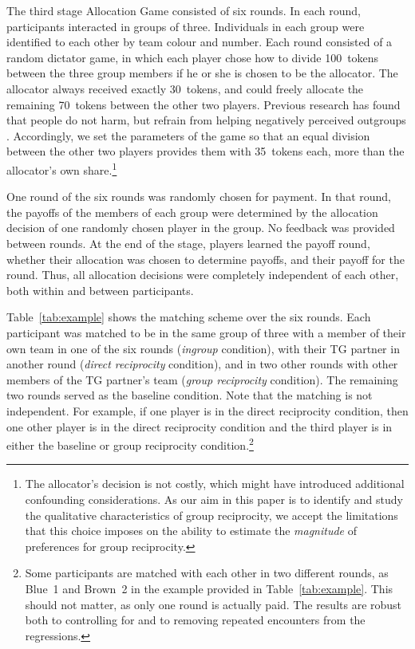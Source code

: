 \documentclass[12pt,a4paper]{article}\usepackage[]{graphicx}\usepackage[]{color}
\begin{document}
The third stage Allocation Game consisted of six rounds. In each round, participants interacted in groups of three. Individuals in each group were identified to each other by
team colour and number. Each round consisted of a random dictator game, in which each player chose how to divide 100~tokens between the three group members if he or she is chosen to be the allocator. The allocator always received exactly 30~tokens, and could freely allocate the remaining 70~tokens between the other two players. Previous research has found that
people do not harm, but refrain from helping negatively perceived outgroups
\citep{weisel2015ingroup}. Accordingly, we set the parameters of the game so
that an equal division between the other two players provides them with 35~tokens each, more than the allocator's own share.\footnote{
  The allocator's decision is not costly, which might have introduced additional confounding considerations. As our aim in this paper is to identify and study the qualitative characteristics of group reciprocity, we accept the limitations that this choice imposes on the ability to estimate the \emph{magnitude} of preferences for group reciprocity. 
}

One round of the six rounds was randomly chosen for payment. In that round, the payoffs of the members of each group were determined by the allocation decision of one randomly chosen player in the group. No feedback was provided between rounds. At the end of the stage, players learned the payoff round, whether their allocation was chosen to determine payoffs, and their payoff for the round. Thus, all allocation decisions were completely independent of each other, both within and between participants.


Table~\ref{tab:example} shows the matching scheme over the six rounds. Each participant was matched to be in the same group of three with a member of their own team in one of the six rounds (\emph{ingroup} condition), with their TG partner in another round (\emph{direct reciprocity} condition), and in two other rounds with other members of the TG partner's team (\emph{group reciprocity} condition). The remaining two rounds served as the baseline condition. Note that the matching is not independent. For example, if one player is in the direct reciprocity condition, then one other player is in the direct reciprocity condition and the third player is in either the baseline or group reciprocity condition.\footnote{
Some participants are matched with each other in two different rounds, as Blue~1 and Brown~2 in the example provided in Table~\ref{tab:example}. This should not matter, as only one round is actually paid. The results are robust both to controlling for and to removing repeated encounters from the regressions.
}
\end{document}
